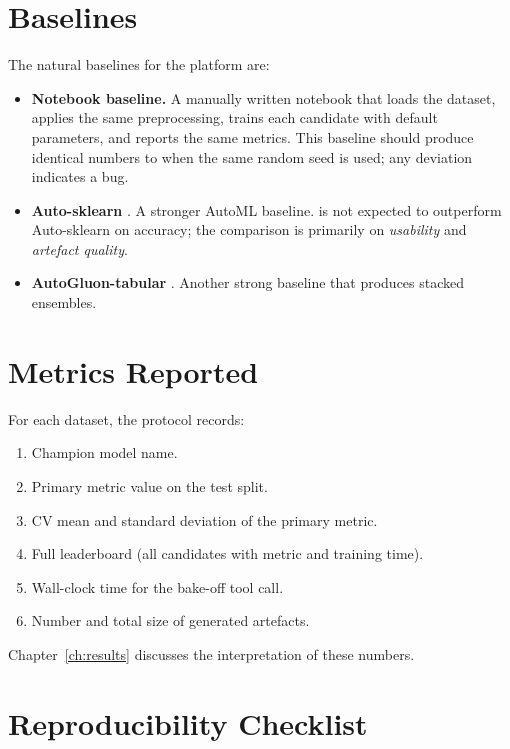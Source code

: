 \section{Baselines}
\label{sec:baselines}

The natural baselines for the platform are:

\begin{itemize}[leftmargin=1.4em]
  \item \textbf{Notebook baseline.} A manually written notebook that
        loads the dataset, applies the same preprocessing, trains
        each candidate with default parameters, and reports the
        same metrics. This baseline should produce identical
        numbers to \projname{} when the same random seed is used;
        any deviation indicates a bug.
  \item \textbf{Auto-sklearn} \citep{feurer2015autosklearn}.
        A stronger AutoML baseline. \projname{} is not expected to
        outperform Auto-sklearn on accuracy; the comparison is
        primarily on \emph{usability} and \emph{artefact quality}.
  \item \textbf{AutoGluon-tabular} \citep{erickson2020autogluon}.
        Another strong baseline that produces stacked ensembles.
\end{itemize}

\section{Metrics Reported}
\label{sec:metrics-reported}

For each dataset, the protocol records:

\begin{enumerate}[leftmargin=1.4em]
  \item Champion model name.
  \item Primary metric value on the test split.
  \item CV mean and standard deviation of the primary metric.
  \item Full leaderboard (all candidates with metric and training time).
  \item Wall-clock time for the bake-off tool call.
  \item Number and total size of generated artefacts.
\end{enumerate}

Chapter~\ref{ch:results} discusses the interpretation of these
numbers.

\section{Reproducibility Checklist}
\label{sec:repro-checklist}

